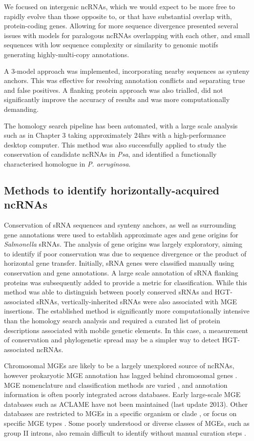 We focused on intergenic ncRNAs, which we would expect to be more free to rapidly evolve than those opposite to, or that have substantial overlap with, protein-coding genes. Allowing for more sequence divergence presented several issues with models for paralogous ncRNAs overlapping with each other, and small sequences with low sequence complexity or similarity to genomic motifs generating highly-multi-copy annotations.

A 3-model approach was implemented, incorporating nearby sequences as synteny anchors. This was effective for resolving annotation conflicts and separating true and false positives. A flanking protein approach was also trialled, did not significantly improve the accuracy of results and was more computationally demanding.

The homology search pipeline has been automated, with a large scale analysis such as in Chapter 3 taking approximately 24hrs with a high-performance desktop computer. This method was also successfully applied to study the conservation of candidate ncRNAs in \textit{Psa}, and identified a functionally characterised homologue in \textit{P. aeruginosa}.

\subsection{Methods to identify horizontally-acquired ncRNAs}

Conservation of sRNA sequences and synteny anchors, as well as surrounding gene annotations were used to establish approximate ages and gene origins for \textit{Salmonella} sRNAs.
The analysis of gene origins was largely exploratory, aiming to identify if poor conservation was due to sequence divergence or the product of horizontal gene transfer. Initially, sRNA genes were classified manually using conservation and gene annotations. A large scale annotation of sRNA flanking proteins was subsequently added to provide a metric for classification. While this method was able to distinguish between poorly conserved sRNAs and HGT-associated sRNAs, vertically-inherited sRNAs were also associated with MGE insertions. The established method is significantly more computationally intensive than the homology search analysis and required a curated list of protein descriptions associated with mobile genetic elements. In this case, a measurement of conservation and phylogenetic spread may be a simpler way to detect HGT-associated ncRNAs.

Chromosomal MGEs are likely to be a largely unexplored source of ncRNAs, however prokaryotic MGE annotation has lagged behind chromosomal genes \citep{Frost2005-wt}. MGE nomenclature and classification methods are varied \citep{Piegu2015-dq}, and annotation information is often poorly integrated across databases. Early large-scale MGE databases such as ACLAME \citep{Leplae2010-zq} have not been maintained (last update 2013). Other databases are restricted to MGEs in a specific organism or clade \citep{Partridge2018-mh}, or focus on specific MGE types \citep{Arndt2016-hj}. Some poorly understood or diverse classes of MGEs, such as group II introns, also remain difficult to identify without manual curation steps \citep{Candales2012-ws}.

